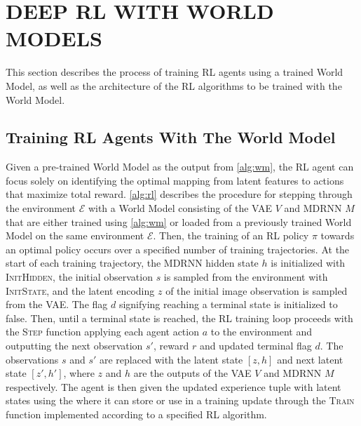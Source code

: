 \section{DEEP RL WITH WORLD MODELS}

This section describes the process of training RL agents using a trained World Model, as well as the architecture of the RL algorithms to be trained with the World Model.

\subsection{Training RL Agents With The World Model}

Given a pre-trained World Model as the output from \cref{alg:wm}, the RL agent can focus solely on identifying the optimal mapping from latent features to actions that maximize total reward. \cref{alg:rl} describes the procedure for stepping through the environment $\mathcal{E}$ with a World Model consisting of the VAE $V$ and MDRNN $M$ that are either trained using \cref{alg:wm} or loaded from a previously trained World Model on the same environment $\mathcal{E}$. Then, the training of an RL policy $\pi$ towards an optimal policy occurs over a specified number of training trajectories. At the start of each training trajectory, the MDRNN hidden state $h$ is initialized with \textsc{InitHidden}, the initial observation $s$ is sampled from the environment with \textsc{InitState}, and the latent encoding $z$ of the initial image observation is sampled from the VAE. The flag $d$ signifying reaching a terminal state is initialized to false. Then, until a terminal state is reached, the RL training loop proceeds with the \textsc{Step} function applying each agent action $a$ to the environment and outputting the next observation $s'$, reward $r$ and updated terminal flag $d$. The observations $s$ and $s'$ are replaced with the latent state $[z,h]$ and next latent state $[z',h']$, where $z$ and $h$ are the outputs of the VAE $V$ and MDRNN $M$ respectively. The agent is then given the updated experience tuple with latent states using the where it can store or use in a training update through the \textsc{Train} function implemented according to a specified RL algorithm.

